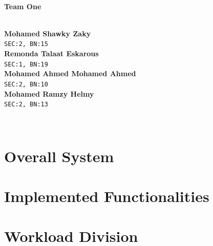 \documentclass[a4paper,12pt]{article}
\begin{document}
\begin{titlepage}

\HRule \\[0.4cm]
{ \huge \bfseries Team One}\\[0.4cm] %
\HRule \\[1cm]
 
\begin{minipage}{0.8\textwidth}
\begin{flushleft} 
\textbf{Mohamed Shawky Zaky} \\
\texttt{SEC:2, BN:15} \\[0.5cm]

\textbf{Remonda Talaat Eskarous} \\
\texttt{SEC:1, BN:19} \\[0.5cm]

\textbf{Mohamed Ahmed Mohamed Ahmed} \\
\texttt{SEC:2, BN:10} \\[0.5cm]

\textbf{Mohamed Ramzy Helmy} \\
\texttt{SEC:2, BN:13}

\end{flushleft}
\end{minipage}\\[6cm]

\end{titlepage}

\thispagestyle{empty}

\tableofcontents
\listoffigures
\clearpage


\section{Overall System}


\section{Implemented Functionalities}


\section{Workload Division}

\end{document}
